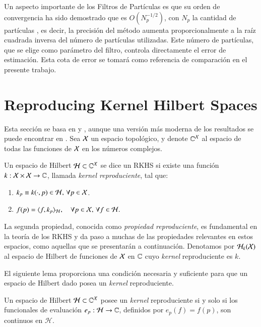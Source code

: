 Un aspecto importante de los Filtros de Partículas es que su orden de convergencia ha sido demostrado que es $O(N_p^{-1/2})$, con $N_p$ la cantidad de partículas \cite{Crisan2002APractitioners, Chopin2020AnCarlo}, es decir, la precisión del método aumenta proporcionalmente a la raíz cuadrada inversa del número de partículas utilizadas. Este número de partículas, que se elige como parámetro del filtro, controla directamente el error de estimación. Esta cota de error se tomará como referencia de comparación en el presente trabajo.

\section{Reproducing Kernel Hilbert Spaces}
Esta sección se basa en \cite{Wendland2004ScatteredApproximation} y \cite{Berlinet2004ReproducingStatistics}, aunque una versión más moderna de los resultados se puede encontrar en \cite{Saitoh2016TheoryApplications}. Sea \( \mathcal{X} \) un espacio topológico, y denote \(\mathbb{C}^{\mathcal{X}}\) al espacio de todas las funciones de \( \mathcal{X} \) en los números complejos. 

\begin{defn}  
Un espacio de Hilbert \( \mathcal{H} \subset \mathbb{C}^{\mathcal{X}} \) se dice un RKHS si existe una función \( k: \mathcal{X} \times \mathcal{X} \to \mathbb{C} \), llamada \textit{kernel reproduciente}, tal que:
\begin{enumerate}
    \item \( k_p \equiv k(\cdot, p) \in \mathcal{H}, \, \forall p \in \mathcal{X} \).
    \item \( f(p) = \langle f, k_p \rangle_{\mathcal{H}}, \quad \forall p \in \mathcal{X}, \, \forall f \in \mathcal{H}. \)
\end{enumerate}
\end{defn}

\noindent La segunda propiedad, conocida como \textit{propiedad reproduciente}, es fundamental en la teoría de los RKHS y da paso a muchas de las propiedades relevantes en estos espacios, como aquellas que se presentarán a continuación. Denotamos por \( \mathcal{H}_k(\mathcal{X}) \) al espacio de Hilbert de funciones de \( \mathcal{X} \) en \( \mathbb{C} \) cuyo \textit{kernel} reproduciente es \( k \).

El siguiente lema proporciona una condición necesaria y suficiente para que un espacio de Hilbert dado posea un \textit{kernel} reproduciente.

\begin{lema}
Un espacio de Hilbert \( \mathcal{H} \subset \mathbb{C}^{\mathcal{X}} \) posee un \textit{kernel} reproduciente si y solo si los funcionales de evaluación \( e_p: \mathcal{H} \to \mathbb{C} \), definidos por \( e_p(f) = f(p) \), son continuos en \( \mathcal{H} \).
\end{lema}

